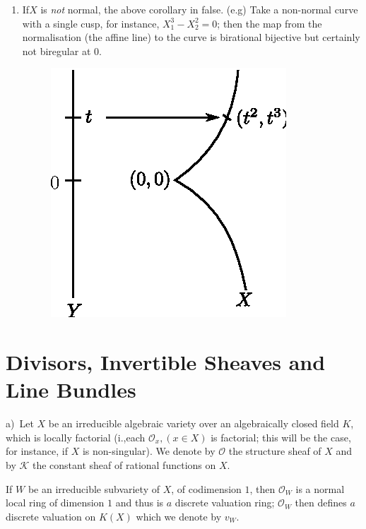 {\begin{remarks*}
\begin{enumerate}
    \item If\pageoriginale $X$ is \textit{ not } normal, the above
      corollary in false. 
      (e.g) \quad Take a non-normal curve with a single cusp, for instance,
      $X^{3}_{1} - X^{2}_{2} = 0$; then the map from the normalisation (the
      affine line) to the curve is birational bijective but certainly not
      biregular at $0$.   
      \begin{figure}[H]
        \centerline{\includegraphics{vol36-figures/fig36-2.eps}}
      \end{figure}
  \end{enumerate}
\end{remarks*}

\section{Divisors, Invertible Sheaves and Line Bundles}\label{chap1:sec2}%
 
 a)~\pageoriginale  Let $X$ be an irreducible algebraic variety over an
 algebraically closed field $K$, which is locally factorial (i.,each
 $\mathscr{O}_{x}, (x \in X)$ is factorial; this will be the case, for
 instance, if $X$ is non-singular). We denote by $\mathscr{O}$ the
 structure sheaf of $X$ and by $\mathscr{K}$ the constant sheaf of
 rational functions on $X$.   
 
 If $W$ be an irreducible subvariety of $X$, of codimension $1$, then
 $\mathscr{O}_{W}$ is a normal local ring of dimension $1$ and thus is
 $a$ discrete valuation ring; $\mathscr{O}_{W}$ then defines $a$
 discrete valuation on $K(X)$ which we denote by $v_{W}$. 
 
}
